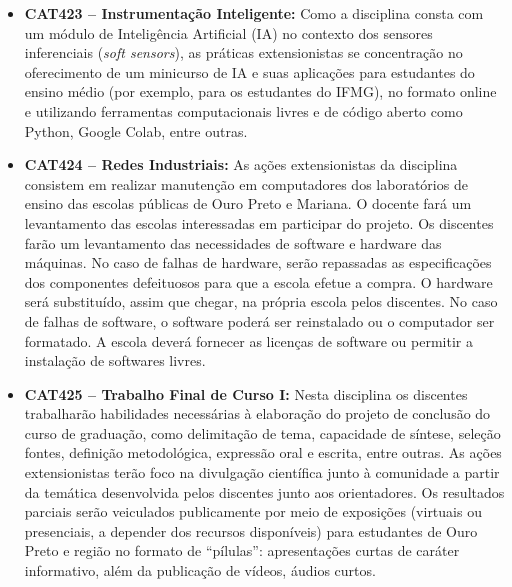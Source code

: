 \documentclass[
	12pt,				%
	openright,			%
	oneside,			%
	a4paper,			%
	english,			%
	brazil				%
	]{abntex2}
\begin{document}
\begin{itemize}
    \item \textbf{CAT423 -- Instrumentação Inteligente:} Como a disciplina consta com um módulo de Inteligência Artificial (IA) no contexto dos sensores inferenciais (\textit{soft sensors}), as práticas extensionistas se concentração no oferecimento de um minicurso de IA e suas aplicações para estudantes do ensino médio (por exemplo, para os estudantes do IFMG), no formato online e utilizando ferramentas computacionais livres e de código aberto como Python, Google Colab, entre outras.

    \item \textbf{CAT424 -- Redes Industriais:} As ações extensionistas da disciplina consistem em realizar manutenção em computadores dos laboratórios de ensino das escolas públicas de Ouro Preto e Mariana. O docente fará um levantamento das escolas interessadas em participar do projeto. Os discentes farão um levantamento das necessidades de software e hardware das máquinas. No caso de falhas de hardware, serão repassadas as especificações dos componentes defeituosos para que a escola efetue a compra. O hardware será substituído, assim que chegar, na própria escola pelos discentes. No caso de falhas de software, o software poderá ser reinstalado ou o computador ser formatado. A escola deverá fornecer as licenças de software ou permitir a instalação de softwares livres.

     \item \textbf{CAT425 -- Trabalho Final de Curso I:} Nesta disciplina os discentes trabalharão habilidades necessárias à elaboração do projeto de conclusão do curso de graduação, como delimitação de tema, capacidade de síntese, seleção fontes, definição metodológica, expressão oral e escrita, entre outras. As ações extensionistas terão foco na divulgação científica junto à comunidade a partir da temática desenvolvida pelos discentes junto aos orientadores. Os resultados parciais serão veiculados publicamente por meio de exposições (virtuais ou presenciais, a depender dos recursos disponíveis) para estudantes de Ouro Preto e região no formato de ``pílulas'': apresentações curtas de caráter informativo, além da publicação de vídeos, áudios  curtos.


\end{itemize}
\end{document}

